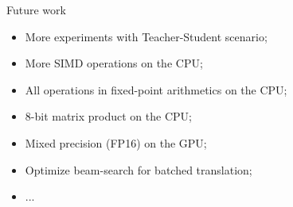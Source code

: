 \documentclass[aspectratio=169]{beamer}					%
\begin{document}
\begin{frame}{Future work}
\begin{itemize}
\item More experiments with Teacher-Student scenario;
\item More SIMD operations on the CPU;
\item All operations in fixed-point arithmetics on the CPU;
\item 8-bit matrix product on the CPU;
\item Mixed precision (FP16) on the GPU;
\item Optimize beam-search for batched translation;
\item ...
\end{itemize}
\end{frame}

{

}
\end{document}
